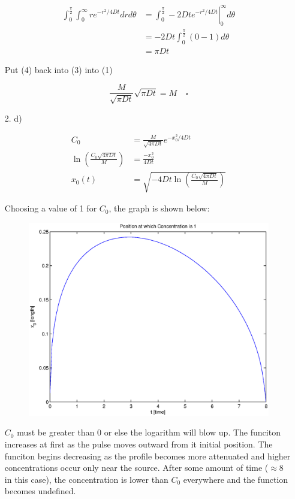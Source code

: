 \documentclass[11pt]{article}
\begin{document}
\begin{enumerate}
\begin{align}
 \int^{\frac{\pi}{2}}_{0}\int^\infty_{0}re^{-r^2/4Dt}drd\theta &= \left.\int^{\frac{\pi}{2}}_{0}-2Dte^{-r^2/4Dt}\right|^\infty_0d\theta\nonumber\\
& = -2Dt\int^{\frac{\pi}{2}}_{0}(0-1)d\theta\nonumber\\
& = \pi Dt
\end{align}

Put (4) back into (3) into (1)

$$\frac{M}{\sqrt{\pi Dt}}\sqrt{\pi Dt} = M \,\,\,\,\,\,\square$$


\item[2. d)]

\begin{align}
C_0 &= \frac{M}{\sqrt{4\pi Dt}}e^{-x_0^2/4Dt}\nonumber\\
\ln\left(\frac{C_0\sqrt{4\pi Dt}}{M}\right) & = \frac{-x_0^2}{4Dt}\nonumber\\
x_0(t) &= \sqrt{-4Dt\ln\left(\frac{C_0\sqrt{4\pi Dt}}{M}\right)}\nonumber
\end{align}

Choosing a value of 1 for $C_0$, the graph is shown below:

\begin{figure}[htbp] %
   \centering
   \includegraphics[width=\textwidth]{xvt.eps} 
\end{figure}

$C_0$ must be greater than 0 or else the logarithm will blow up.  The funciton increases at first as the pulse moves outward from it initial position.  The funciton begins decreasing as the profile becomes more attenuated and higher concentrations occur only near the source.  After some amount of time ($\approx$8 in this case), the concentration is lower than $C_0$ everywhere and the function becomes undefined. 

\end{enumerate}
\end{document}
